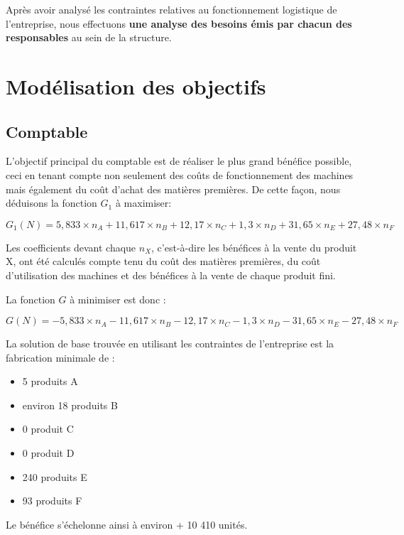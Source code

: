 \documentclass[a4paper,10pt]{article}
\begin{document}
Après avoir analysé les contraintes relatives au fonctionnement logistique de l'entreprise, nous effectuons \textbf{une analyse des besoins émis par chacun des responsables} au sein de la structure.


\section{Modélisation des objectifs}


\subsection{Comptable}

L'objectif principal du comptable est de réaliser le plus grand bénéfice possible, ceci en tenant compte non seulement des coûts de fonctionnement des machines mais également du coût d'achat des matières premières. De cette façon, nous déduisons la fonction $G_1$ à maximiser:

$$G_1(N) = 5,833 \times n_A + 11,617 \times n_B + 12,17 \times n_C + 1,3 \times n_D + 31,65 \times n_E + 27,48 \times n_F$$

Les coefficients devant chaque $n_X$, c'est-à-dire les bénéfices à la vente du produit X, ont été calculés compte tenu du coût des matières premières, du coût d'utilisation des machines et des bénéfices à la vente de chaque produit fini.\newline


La fonction $G$ à minimiser est donc :

$$G(N) = -5,833 \times n_A - 11,617 \times n_B - 12,17 \times n_C - 1,3 \times n_D - 31,65 \times n_E - 27,48 \times n_F$$

La solution de base trouvée en utilisant les contraintes de l'entreprise est la fabrication minimale de :\newline
\begin{itemize}
\item[\textbullet] 5 produits A
\item[\textbullet] environ 18 produits B
\item[\textbullet] 0 produit C
\item[\textbullet] 0 produit D
\item[\textbullet] 240 produits E
\item[\textbullet] 93 produits F\newline
\end{itemize}
Le bénéfice s'échelonne ainsi à environ + 10 410 unités.\newline
\end{document}
